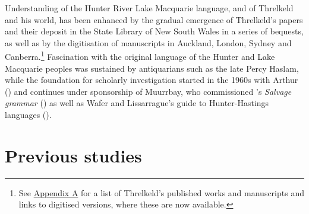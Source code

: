 Understanding of the Hunter River Lake Macquarie language, and of Threlkeld and his world, has been enhanced by the gradual emergence of Threlkeld’s papers and their deposit in the State Library of New South Wales in a series of bequests, as well as by the digitisation of manuscripts in Auckland, London, Sydney and Canberra.\footnote{See \hyperref[Appendix_A]{Appendix A} for a list of Threlkeld’s published works and manuscripts and links to digitised versions, where these are now available.} Fascination with the original language of the Hunter and Lake Macquarie peoples was sustained by antiquarians such as the late Percy Haslam, while the foundation for scholarly investigation started in the 1960s with Arthur \citeauthor{capell_aboriginal_1970} (\citeyear{capell_aboriginal_1970, capell_new_1966, capell_studies_1966, capell_linguistic_1963}) and continues under sponsorship of Muurrbay, who commissioned \citeauthor{lissarrague_salvage_2006}’s \textit{Salvage grammar} (\citeyear{lissarrague_salvage_2006}) as well as Wafer and Lissarrague’s guide to Hunter-Hastings languages (\citeyear{wafer_handbook_2008}).

\section{Previous studies}

